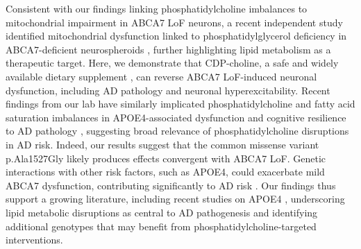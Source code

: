 Consistent with our findings linking phosphatidylcholine imbalances to mitochondrial impairment in ABCA7 LoF neurons, a recent independent study identified mitochondrial dysfunction linked to phosphatidylglycerol deficiency in ABCA7-deficient neurospheroids \supercite{Kawatani2023-vf}, further highlighting lipid metabolism as a therapeutic target. Here, we demonstrate that CDP-choline, a safe and widely available dietary supplement \supercite{Gavrilova2018-oi,Zeisel2009-xv,Blusztajn2017-nv}, can reverse ABCA7 LoF-induced neuronal dysfunction, including AD pathology and neuronal hyperexcitability. Recent findings from our lab have similarly implicated phosphatidylcholine and fatty acid saturation imbalances in APOE4-associated dysfunction \supercite{Sienski2021-zt} and cognitive resilience to AD pathology \supercite{Mathys2024-ex}, suggesting broad relevance of phosphatidylcholine disruptions in AD risk. Indeed, our results suggest that the common missense variant p.Ala1527Gly likely produces effects convergent with ABCA7 LoF. Genetic interactions with other risk factors, such as APOE4, could exacerbate mild ABCA7 dysfunction, contributing significantly to AD risk \supercite{Wang2021-oa,Hemani2013-zr,Haig2011-vs,Zuk2012-uz}. Our findings thus support a growing literature, including recent studies on APOE4 \supercite{Haney2024-fx,Victor2022-tl}, underscoring lipid metabolic disruptions as central to AD pathogenesis and identifying additional genotypes that may benefit from phosphatidylcholine-targeted interventions.


